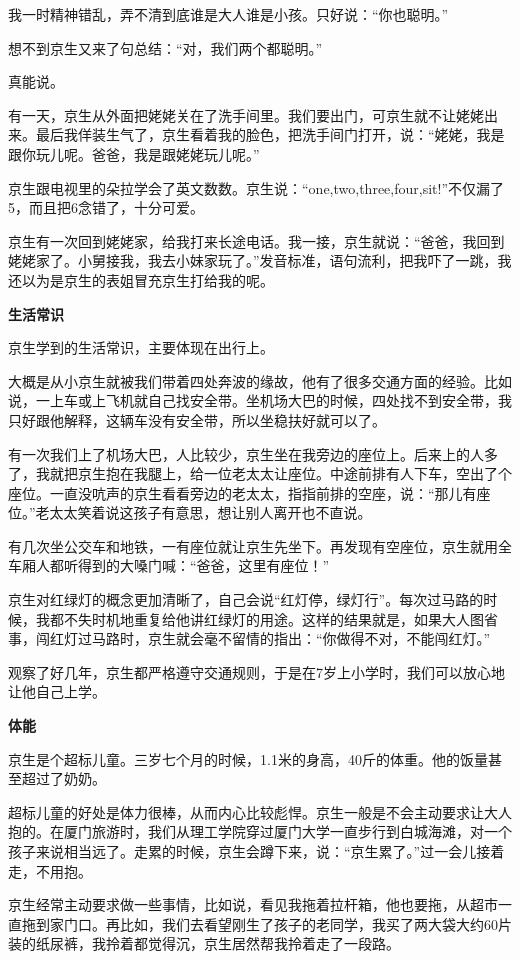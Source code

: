 \documentclass[twoside,openright,headings=optiontohead]{ctexbook} %
\begin{document}
{我一时精神错乱，弄不清到底谁是大人谁是小孩。只好说：``你也聪明。''

想不到京生又来了句总结：``对，我们两个都聪明。''

真能说。

有一天，京生从外面把姥姥关在了洗手间里。我们要出门，可京生就不让姥姥出来。最后我佯装生气了，京生看着我的脸色，把洗手间门打开，说：``姥姥，我是跟你玩儿呢。爸爸，我是跟姥姥玩儿呢。''

京生跟电视里的朵拉学会了英文数数。京生说：``one,two,three,four,sit!''不仅漏了5，而且把6念错了，十分可爱。

京生有一次回到姥姥家，给我打来长途电话。我一接，京生就说：``爸爸，我回到姥姥家了。小舅接我，我去小妹家玩了。''发音标准，语句流利，把我吓了一跳，我还以为是京生的表姐冒充京生打给我的呢。

\textbf{生活常识}

京生学到的生活常识，主要体现在出行上。

大概是从小京生就被我们带着四处奔波的缘故，他有了很多交通方面的经验。比如说，一上车或上飞机就自己找安全带。坐机场大巴的时候，四处找不到安全带，我只好跟他解释，这辆车没有安全带，所以坐稳扶好就可以了。

有一次我们上了机场大巴，人比较少，京生坐在我旁边的座位上。后来上的人多了，我就把京生抱在我腿上，给一位老太太让座位。中途前排有人下车，空出了个座位。一直没吭声的京生看看旁边的老太太，指指前排的空座，说：``那儿有座位。''老太太笑着说这孩子有意思，想让别人离开也不直说。

有几次坐公交车和地铁，一有座位就让京生先坐下。再发现有空座位，京生就用全车厢人都听得到的大嗓门喊：``爸爸，这里有座位！''

京生对红绿灯的概念更加清晰了，自己会说``红灯停，绿灯行''。每次过马路的时候，我都不失时机地重复给他讲红绿灯的用途。这样的结果就是，如果大人图省事，闯红灯过马路时，京生就会毫不留情的指出：``你做得不对，不能闯红灯。''

观察了好几年，京生都严格遵守交通规则，于是在7岁上小学时，我们可以放心地让他自己上学。

\textbf{体能}

京生是个超标儿童。三岁七个月的时候，1.1米的身高，40斤的体重。他的饭量甚至超过了奶奶。

超标儿童的好处是体力很棒，从而内心比较彪悍。京生一般是不会主动要求让大人抱的。在厦门旅游时，我们从理工学院穿过厦门大学一直步行到白城海滩，对一个孩子来说相当远了。走累的时候，京生会蹲下来，说：``京生累了。''过一会儿接着走，不用抱。

京生经常主动要求做一些事情，比如说，看见我拖着拉杆箱，他也要拖，从超市一直拖到家门口。再比如，我们去看望刚生了孩子的老同学，我买了两大袋大约60片装的纸尿裤，我拎着都觉得沉，京生居然帮我拎着走了一段路。

}
\end{document}
